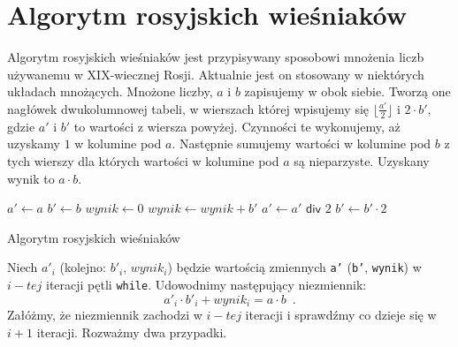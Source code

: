 \section{Algorytm rosyjskich wieśniaków}

Algorytm rosyjskich wieśniaków jest przypisywany sposobowi mnożenia liczb używanemu w XIX-wiecznej Rosji.
Aktualnie jest on stosowany w niektórych układach mnożących.
Mnożone liczby, $a$ i $b$ zapisujemy w obok siebie.
Tworzą one nagłówek dwukolumnowej tabeli, w wierszach której wpisujemy się $\lfloor\frac{a'}{2}\rfloor$ i $2 \cdot b'$, gdzie $a'$ i $b'$ to wartości z wiersza powyżej. 
Czynności te wykonujemy, aż uzyskamy $1$ w kolumine pod $a$. 
Następnie sumujemy wartości w kolumine pod $b$ z tych wierszy dla których wartości w kolumine pod $a$ są nieparzyste.
Uzyskany wynik to $a \cdot b$.

\begin{algorithm}[h]
  \DontPrintSemicolon
  
  
  
  $a' \leftarrow a$\;
  $b' \leftarrow b$\;
  $wynik \leftarrow 0$\;
  {
    {
      $wynik \leftarrow wynik + b'$\;
    }
    $a' \leftarrow a' \textsf{ div } 2$\;
    $b' \leftarrow b' \cdot 2$\;
  }
  
  \caption{Algorytm rosyjskich wieśniaków}
  \label{alg-wiesniakow}
\end{algorithm}

Niech $a'_i$ (kolejno: $b'_i$, $wynik_i$) będzie wartością zmiennych \texttt{a'} (\texttt{b'}, \texttt{wynik}) w $i-tej$ iteracji pętli \texttt{while}. 
Udowodnimy następujący niezmiennik:
\[
a'_i \cdot b'_i + wynik_i = a \cdot b \enspace.
\]
Załóżmy, że niezmiennik zachodzi w $i-tej$ iteracji i sprawdźmy co dzieje się w $i+1$ iteracji.
Rozważmy dwa przypadki.



